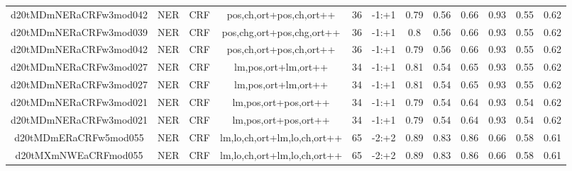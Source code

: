 \documentclass[a4paper]{article}
\begin{document}
\begin{landscape}
\begin{center}
\begin{tabular}{ |c|c|c|c|c|c|c|c|c|c|c|c|}
 
 	
 	\small{ d20tMDmNERaCRFw3mod042 } & \small{ NER} & \small{  CRF }  & pos,ch,ort+pos,ch,ort++  &  36 &  \small{  -1:+1 }  &  0.79 & 0.56 & 0.66  &  0.93 & 0.55 & 0.62 \\
 	

 
 	
 	\small{ d20tMDmNERaCRFw3mod039 } & \small{ NER} & \small{  CRF }  & pos,chg,ort+pos,chg,ort++  &  36 &  \small{  -1:+1 }  &  0.8 & 0.56 & 0.66  &  0.93 & 0.55 & 0.62 \\
 	

 
 	
 	\small{ d20tMDmNERaCRFw3mod042 } & \small{ NER} & \small{  CRF }  & pos,ch,ort+pos,ch,ort++  &  36 &  \small{  -1:+1 }  &  0.79 & 0.56 & 0.66  &  0.93 & 0.55 & 0.62 \\
 	

 
 	
 	\small{ d20tMDmNERaCRFw3mod027 } & \small{ NER} & \small{  CRF }  & lm,pos,ort+lm,ort++  &  34 &  \small{  -1:+1 }  &  0.81 & 0.54 & 0.65  &  0.93 & 0.55 & 0.62 \\
 	

 
 	
 	\small{ d20tMDmNERaCRFw3mod027 } & \small{ NER} & \small{  CRF }  & lm,pos,ort+lm,ort++  &  34 &  \small{  -1:+1 }  &  0.81 & 0.54 & 0.65  &  0.93 & 0.55 & 0.62 \\
 	

 
 	
 	\small{ d20tMDmNERaCRFw3mod021 } & \small{ NER} & \small{  CRF }  & lm,pos,ort+pos,ort++  &  34 &  \small{  -1:+1 }  &  0.79 & 0.54 & 0.64  &  0.93 & 0.54 & 0.62 \\
 	

 
 	
 	\small{ d20tMDmNERaCRFw3mod021 } & \small{ NER} & \small{  CRF }  & lm,pos,ort+pos,ort++  &  34 &  \small{  -1:+1 }  &  0.79 & 0.54 & 0.64  &  0.93 & 0.54 & 0.62 \\
 	

 
 	
 	\small{ d20tMDmERaCRFw5mod055 } & \small{ NER} & \small{  CRF }  & lm,lo,ch,ort+lm,lo,ch,ort++  &  65 &  \small{  -2:+2 }  &  0.89 & 0.83 & 0.86  &  0.66 & 0.58 & 0.61 \\
 	

 
 	
 	\small{ d20tMXmNWEaCRFmod055 } & \small{ NER} & \small{  CRF }  & lm,lo,ch,ort+lm,lo,ch,ort++  &  65 &  \small{  -2:+2 }  &  0.89 & 0.83 & 0.86  &  0.66 & 0.58 & 0.61 \\
 	


\end{tabular}
\end{center}
\end{landscape}
\end{document}
